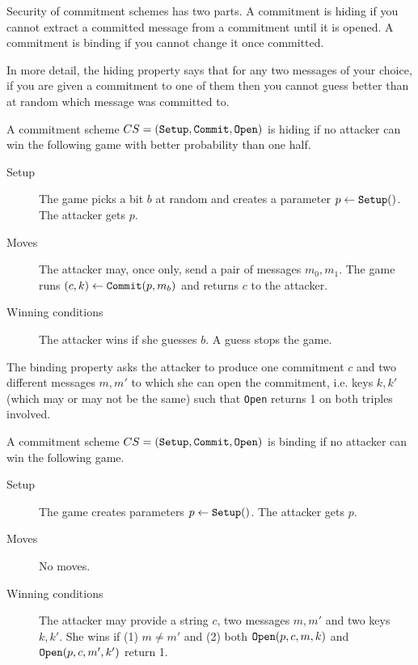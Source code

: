 \documentclass[envcountsame]{llncs}
\newcommand{\alg}[1]{\textup{\texttt{#1}}}
\begin{document}
Security of commitment schemes has two parts. A commitment is hiding if you
cannot extract a committed message from a commitment until it is opened. A
commitment is binding if you cannot change it once committed.

In more detail, the hiding property says that for any two messages of your
choice, if you are given a commitment to one of them then you cannot guess
better than at random which message was committed to.

\begin{definition}
A commitment scheme $CS = (\alg{Setup}, \alg{Commit}, \alg{Open})$ is hiding if
no attacker can win the following game with better probability than one half.

\begin{description}
\item[Setup]
The game picks a bit $b$ at random and creates a parameter $p \gets
\alg{Setup}()$. The attacker gets $p$.

\item[Moves]
The attacker may, once only, send a pair of messages $m_0, m_1$. The game runs
$(c, k) \gets \alg{Commit}(p, m_b)$ and returns $c$ to the attacker.

\item[Winning conditions]
The attacker wins if she guesses $b$. A guess stops the game.
\end{description}
\end{definition}

The binding property asks the attacker to produce one commitment $c$ and two
different messages $m, m'$ to which she can open the commitment, i.e. keys
$k, k'$ (which may or may not be the same) such that \alg{Open} returns 1 on
both triples involved.

\begin{definition}
A commitment scheme $CS = (\alg{Setup}, \alg{Commit}, \alg{Open})$ is binding
if no attacker can win the following game.

\begin{description}
\item[Setup]
The game creates parameters $p \gets \alg{Setup}()$. The attacker gets $p$.

\item[Moves]
No moves.

\item[Winning conditions]
The attacker may provide a string $c$, two messages $m, m'$ and two keys $k,
k'$. She wins if (1) $m \neq m'$ and (2) both $\alg{Open}(p, c, m, k)$ and
$\alg{Open}(p, c, m', k')$ return 1.
\end{description}
\end{definition}
\end{document}
